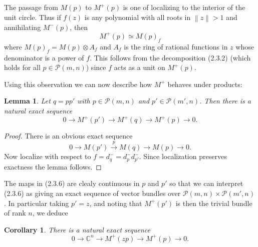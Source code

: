 \documentclass[leqno]{book}
\numberwithin{equation}{section}
\newtheorem{corollary}[theorem]{Corollary}
\newtheorem{lemma}[theorem]{Lemma}
\theoremstyle{definition}
\begin{document}
            The passage from $M(p)$ to $M^{+}(p)$ is one of localizing to the interior of the unit circle. Thus if $f(z)$ is any polynomial with all roots in $\left\| z \right\|>1$ and annihilating $M^{-}(p)$, then
            \begin{equation*}
              M^{+}(p)\simeq M(p)_{f}
            \end{equation*}
            where $M(p)_{f}=M(p)\otimes A_{f}$ and $A_{f}$ is the ring of rational functions in $z$ whose denominator is a power of $f$. This follows from the decomposition (2.3.2) (which holds for all $p \in \mathcal{P}(m,n)$) since $f$ acts as a unit on $M^{+}(p)$.

            Using this observation we can now describe how $M^{+}$ behaves under products:

            \begin{lemma}
              Let $q=p p'$ with $p \in \mathcal{P}(m,n)$ and $p'\in \mathcal{P}(m',n)$. Then there is a natural exact sequence
              \begin{equation*}
                0\to M^{+}(p')\to M^{+}(q)\to M^{+}(p)\to 0.
              \end{equation*}
            \end{lemma}

            \begin{proof}
              There is an obvious exact sequence
              \begin{equation*}
                0\to M(p')\stackrel{p}{\rightarrow} M(q)\to M(p)\to 0.
              \end{equation*}
              Now localize with respect to $f=d_{q}^{-}=d_{p}^{-}d_{p'}^{-}$. Since localization preserves exactness the lemma follows.
            \end{proof}

            The maps in (2.3.6) are clealy continuous in $p$ and $p'$ so that we can interpret (2.3.6) as giving an exact sequence of vector bundles over $\mathcal{P}(m,n)\times \mathcal{P}(m',n)$. In particular taking $p'=z$, and noting that $M^{+}(p')$ is then the trivial bundle of rank $n$, we deduce

            \begin{corollary}
              There is a natural exact sequence
              \begin{equation*}
                0\to \mathbb{C}^{n}\to M^{+}(zp)\to M^{+}(p)\to 0.
              \end{equation*}
            \end{corollary}
\end{document}
